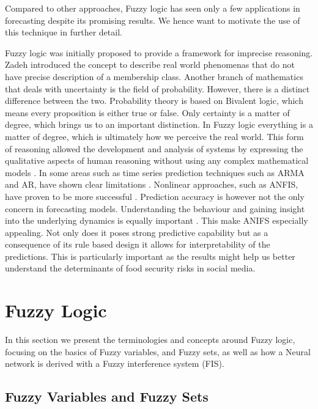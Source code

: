 Compared to other approaches, Fuzzy logic has seen only a few applications in forecasting despite its promising results. We hence want to motivate the use of this technique in further detail. 

Fuzzy logic was initially proposed to provide a framework for imprecise reasoning. Zadeh \cite{Zadeh65} introduced the concept to describe real world phenomenas that do not have precise description of a membership class. Another branch of mathematics that deals with uncertainty is the field of probability. However, there is a distinct difference between the two. Probability theory is based on Bivalent logic, which means every proposition is either true or false. Only certainty is a matter of degree, which brings us to an important distinction. In Fuzzy logic everything is a matter of degree, which is ultimately how we perceive the real world. This form of reasoning allowed the development and analysis of  systems by expressing the qualitative aspects of human reasoning without using any complex mathematical models \cite{Jang91}.  
In some areas such as time series prediction techniques such as ARMA and AR, have shown clear limitations \cite{box90}. Nonlinear approaches, such as ANFIS, have proven to be more successful \cite{chap04}. Prediction accuracy is however not the only concern in forecasting models. Understanding the behaviour and gaining insight into the underlying dynamics is equally important \cite{neil93}. This make ANIFS especially appealing. Not only does it poses strong predictive capability but as a consequence of its rule based design it allows for interpretability of the predictions. This is particularly important as the results might help us better understand the determinants of food security risks in social media. 

\section{Fuzzy Logic}


In this section we present the terminologies and concepts around Fuzzy logic, focusing on the basics of Fuzzy variables, and Fuzzy sets, as well as how a Neural network is derived with a Fuzzy interference system (FIS). 

\subsection {Fuzzy Variables and Fuzzy Sets }

